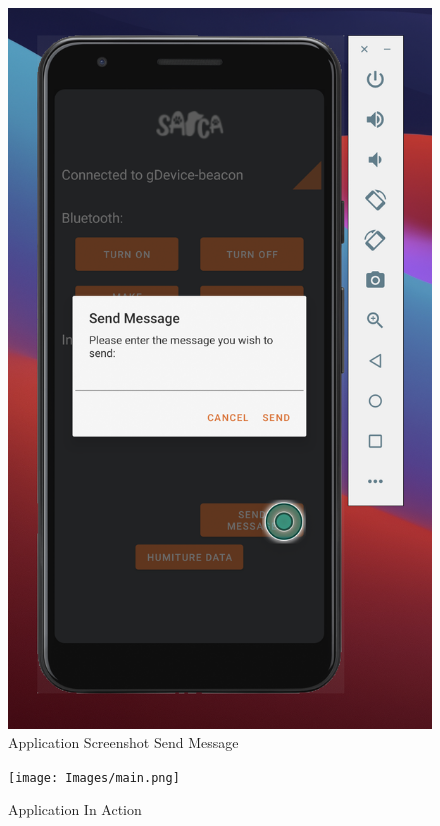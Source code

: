 \documentclass{ueacmpstyle}
\begin{document}
            \begin{figure}[h]
                \centering
                \includegraphics[scale=0.75]{Images/App_photo_3.png}
                \caption{Application Screenshot Send Message}
                \label{Figure App Send Message}
            
            \end{figure}
            \clearpage
            \begin{figure}[h]
                \centering
                \texttt{[image: Images/main.png]}
                \caption{Application In Action}
                \label{Figure App In Action}
            
            \end{figure}
            \clearpage
            
\end{document}
